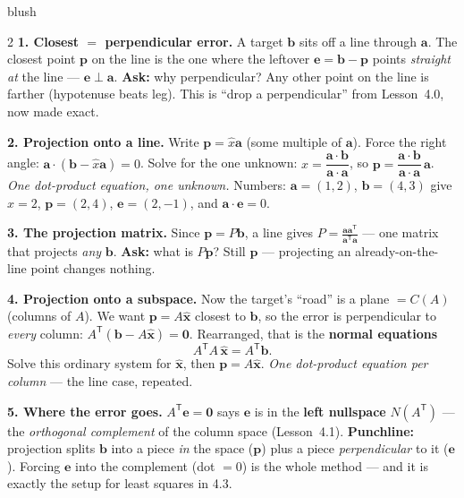 \documentclass[10pt]{article}
\newcommand{\xx}{\mathbf{x}}
\newcommand{\bb}{\mathbf{b}}
\newcommand{\pp}{\mathbf{p}}
\newcommand{\ee}{\mathbf{e}}
\newcommand{\avec}{\mathbf{a}}
\newcommand{\zero}{\mathbf{0}}
\newcommand{\T}{\mathsf{T}}
\begin{document}
\begin{skillbox}[Lesson]{blush}
\begin{multicols}{2}
\textbf{1. Closest $=$ perpendicular error.} A target $\bb$ sits off a line through $\avec$. The closest
point $\pp$ on the line is the one where the leftover $\ee=\bb-\pp$ points \emph{straight at} the line ---
$\ee\perp\avec$. \textbf{Ask:} why perpendicular? Any other point on the line is farther (hypotenuse
beats leg). This is ``drop a perpendicular'' from Lesson~4.0, now made exact.

\textbf{2. Projection onto a line.} Write $\pp=\hat{x}\avec$ (some multiple of $\avec$). Force the right
angle: $\avec\cdot(\bb-\hat{x}\avec)=0$. Solve for the one unknown:
$\hat{x}=\dfrac{\avec\cdot\bb}{\avec\cdot\avec}$, so $\pp=\dfrac{\avec\cdot\bb}{\avec\cdot\avec}\,\avec$.
\emph{One dot-product equation, one unknown.} Numbers: $\avec=(1,2)$, $\bb=(4,3)$ give $\hat{x}=2$,
$\pp=(2,4)$, $\ee=(2,-1)$, and $\avec\cdot\ee=0$.

\textbf{3. The projection matrix.} Since $\pp=P\bb$, a line gives $P=\frac{\avec\avec^{\T}}{\avec^{\T}\avec}$
--- one matrix that projects \emph{any} $\bb$. \textbf{Ask:} what is $P\pp$? Still $\pp$ --- projecting
an already-on-the-line point changes nothing.

\columnbreak

\textbf{4. Projection onto a subspace.} Now the target's ``road'' is a plane $=C(A)$ (columns of $A$).
We want $\pp=A\hat{\xx}$ closest to $\bb$, so the error is perpendicular to \emph{every} column:
$A^{\T}(\bb-A\hat{\xx})=\zero$. Rearranged, that is the \textbf{normal equations}
\[ A^{\T}A\,\hat{\xx}=A^{\T}\bb. \]
Solve this ordinary system for $\hat{\xx}$, then $\pp=A\hat{\xx}$. \emph{One dot-product equation per
column} --- the line case, repeated.

\textbf{5. Where the error goes.} $A^{\T}\ee=\zero$ says $\ee$ is in the \textbf{left nullspace}
$N(A^{\T})$ --- the \emph{orthogonal complement} of the column space (Lesson~4.1). \textbf{Punchline:}
projection splits $\bb$ into a piece \emph{in} the space ($\pp$) plus a piece \emph{perpendicular} to it
($\ee$). Forcing $\ee$ into the complement (dot $=0$) is the whole method --- and it is exactly the
setup for least squares in 4.3.
\end{multicols}
\end{skillbox}
\end{document}
